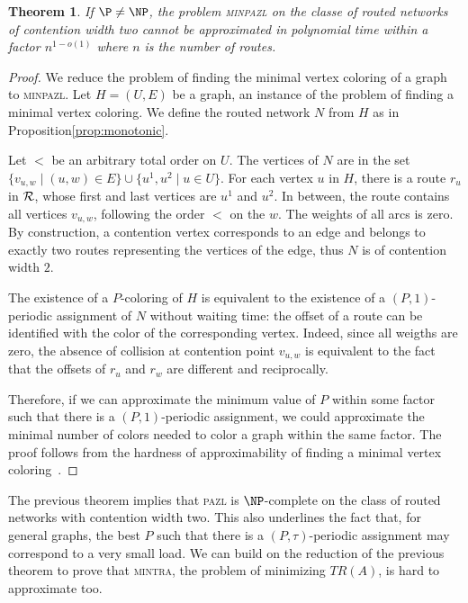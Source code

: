 \documentclass[a4paper,10pt]{article}
\newtheorem{theorem}{Theorem}
\newcommand\pazl{\textsc{pazl}\xspace}
\newcommand\minpazl{\textsc{minpazl}\xspace}
\newcommand\mintra{\textsc{mintra}\xspace}
\begin{document}
\begin{theorem}\label{th:inapprox}
If $\P \neq \NP$, the problem \minpazl on the classe of routed networks of contention width two cannot be approximated in polynomial time within a factor $n^{1-o(1)}$ where $n$ is the number of routes.
\end{theorem}

\begin{proof}
 We reduce the problem of finding the minimal vertex coloring of a graph to \minpazl. Let $H = (U,E)$ be a graph, an instance of the problem of finding a minimal vertex coloring.  We define the routed network $N$ from $H$ as in Proposition\ref{prop:monotonic}.
 
 Let $<$ be an arbitrary total order on $U$. 
 The vertices of $N$ are in the set $\{v_{u,w} \mid (u,w) \in E\} \cup \{u^1, u^2 \mid u \in U\}$. 
 For each vertex $u$ in $H$, there is a route $r_u$ in ${\cal R}$, whose first and last vertices
 are $u^1$ and $u^2$. In between, the route contains all vertices $v_{u,w}$, following the order $<$ on the $w$. The weights of all arcs is zero. By construction, a contention vertex corresponds to an edge and belongs to exactly two routes representing the vertices of the edge, thus $N$ is of contention width $2$.

  The existence of a $P$-coloring of $H$ is equivalent to the existence of a $(P,1)$-periodic assignment of $N$ without waiting time: the offset of a route can be identified with the color of the corresponding vertex. Indeed, since all weigths are zero, the absence of collision at contention point $v_{u,w}$ is equivalent to the fact that the offsets of $r_u$ and $r_w$ are different and reciprocally.

   Therefore, if we can approximate the minimum value of $P$ within some factor such that there is a $(P,1)$-periodic assignment, we could approximate the minimal number of colors needed to color a graph within the same factor. The proof follows from the hardness of approximability of finding a minimal vertex coloring~\cite{zuckerman2006linear}.
\end{proof}

The previous theorem implies that \pazl is $\NP$-complete on the class of routed networks with contention width two. This also underlines the fact that, for general graphs, the best $P$ such that there is a 
$(P,\tau)$-periodic assignment may correspond to a very small load. We can build on the reduction of the previous theorem to prove that \mintra, the problem of minimizing $TR(A)$, is hard to approximate too.
\end{document}
